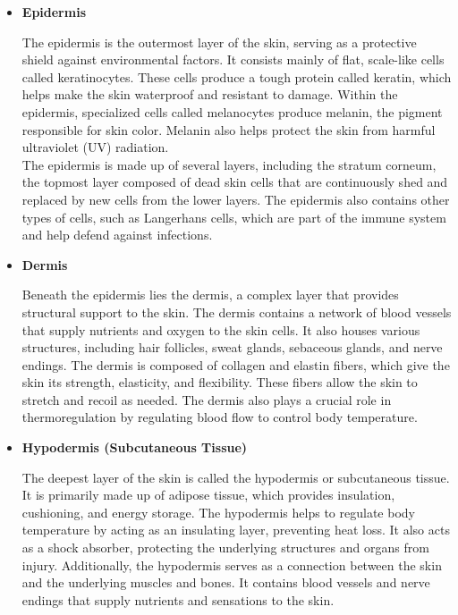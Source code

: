\begin{itemize}
\item \textbf{Epidermis}

The epidermis is the outermost layer of the skin, serving as a protective shield against environmental factors. It consists mainly of flat, scale-like cells called keratinocytes. These cells produce a tough protein called keratin, which helps make the skin waterproof and resistant to damage. Within the epidermis, specialized cells called melanocytes produce melanin, the pigment responsible for skin color. Melanin also helps protect the skin from harmful ultraviolet (UV) radiation. \\

The epidermis is made up of several layers, including the stratum corneum, the topmost layer composed of dead skin cells that are continuously shed and replaced by new cells from the lower layers. The epidermis also contains other types of cells, such as Langerhans cells, which are part of the immune system and help defend against infections.

\newpage

\item \textbf{Dermis}

Beneath the epidermis lies the dermis, a complex layer that provides structural support to the skin. The dermis contains a network of blood vessels that supply nutrients and oxygen to the skin cells. It also houses various structures, including hair follicles, sweat glands, sebaceous glands, and nerve endings.
The dermis is composed of collagen and elastin fibers, which give the skin its strength, elasticity, and flexibility. These fibers allow the skin to stretch and recoil as needed. The dermis also plays a crucial role in thermoregulation by regulating blood flow to control body temperature.

\item \textbf{Hypodermis (Subcutaneous Tissue)}

The deepest layer of the skin is called the hypodermis or subcutaneous tissue. It is primarily made up of adipose tissue, which provides insulation, cushioning, and energy storage. The hypodermis helps to regulate body temperature by acting as an insulating layer, preventing heat loss. It also acts as a shock absorber, protecting the underlying structures and organs from injury.
Additionally, the hypodermis serves as a connection between the skin and the underlying muscles and bones. It contains blood vessels and nerve endings that supply nutrients and sensations to the skin.

\end{itemize}

